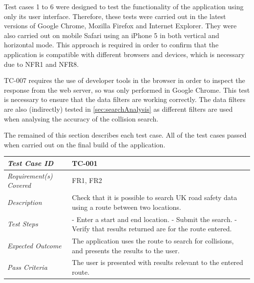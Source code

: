 \documentclass[authoryearcitations]{UoYCSproject}
\begin{document}
Test cases 1 to 6 were designed to test the functionality of the application using only its user interface. Therefore, these tests were carried out in the latest versions of Google Chrome, Mozilla Firefox and Internet Explorer. They were also carried out on mobile Safari using an iPhone 5 in both vertical and horizontal mode. This approach is required in order to confirm that the application is compatible with different browsers and devices, which is necessary due to NFR1 and NFR8.

TC-007 requires the use of developer tools in the browser in order to inspect the response from the web server, so was only performed in Google Chrome. This test is necessary to ensure that the data filters are working correctly. The data filters are also (indirectly) tested in \autoref{sec:searchAnalysis} as different filters are used when analysing the accuracy of the collision search.

The remained of this section describes each test case. All of the test cases passed when carried out on the final build of the application.

\begin{tabular}{| p{2.5cm} | p{11cm} |}
	\hline
	\textit{Test Case ID} & TC-001 \\ \hline
	\textit{Requirement(s) Covered} & FR1, FR2 \\ \hline
	\textit{Description} & Check that it is possible to search UK road safety data using a route between two locations.  \\ \hline
	\textit{Test Steps}& - Enter a start and end location.
	\newline - Submit the search.
	\newline - Verify that results returned are for the route entered.
 \\ \hline
	\textit{Expected Outcome} & The application uses the route to search for collisions, and presents the results to the user.  \\ \hline
	\textit{Pass Criteria} & The user is presented with results relevant to the entered route.  \\ \hline
\end{tabular}
\end{document}
